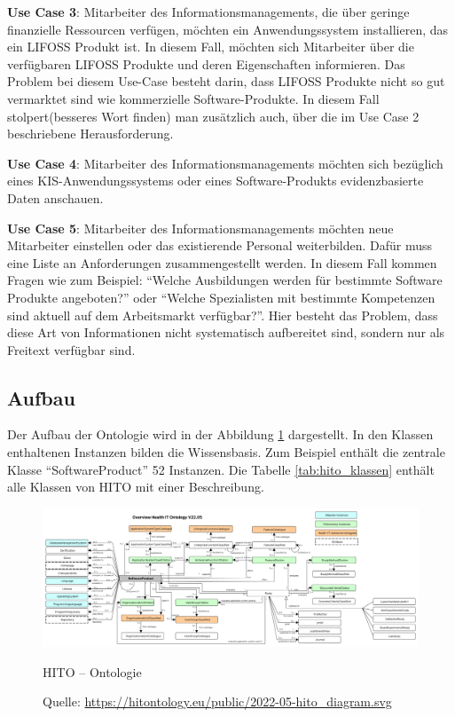 \textbf{Use Case 3}: Mitarbeiter des Informationsmanagements, die über geringe finanzielle Ressourcen verfügen, möchten ein Anwendungssystem installieren, das ein \ac{LIFOSS} Produkt ist.
In diesem Fall, möchten sich Mitarbeiter über die verfügbaren \ac{LIFOSS} Produkte und deren Eigenschaften informieren.
Das Problem bei diesem Use-Case besteht darin, dass \ac{LIFOSS} Produkte nicht so gut vermarktet sind wie kommerzielle Software-Produkte. 
In diesem Fall stolpert(besseres Wort finden) man zusätzlich auch, über die im Use Case 2 beschriebene Herausforderung. \newline

\textbf{Use Case 4}: Mitarbeiter des Informationsmanagements möchten sich bezüglich eines KIS-Anwendungssystems oder eines Software-Produkts evidenzbasierte Daten anschauen.  \newline

\textbf{Use Case 5}: Mitarbeiter des Informationsmanagements möchten neue Mitarbeiter einstellen oder das existierende Personal weiterbilden.
Dafür muss eine Liste an Anforderungen zusammengestellt werden.
In diesem Fall kommen Fragen wie zum Beispiel: \enquote{Welche Ausbildungen werden für bestimmte Software Produkte angeboten?} oder \enquote{Welche Spezialisten mit bestimmte Kompetenzen sind aktuell auf dem Arbeitsmarkt verfügbar?}.
Hier besteht das Problem, dass diese Art von Informationen nicht systematisch aufbereitet sind, sondern nur als Freitext verfügbar sind.\newline

\subsection{Aufbau}

Der Aufbau der Ontologie wird in der Abbildung \ref{fig:metamodel} dargestellt. 
In den Klassen enthaltenen Instanzen bilden die Wissensbasis.
Zum Beispiel enthält die zentrale Klasse \enquote{SoftwareProduct} 52 Instanzen.
Die Tabelle \ref{tab:hito_klassen} enthält alle Klassen von HITO mit einer Beschreibung.

\begin{figure}
    	\includegraphics[width=\textwidth]{Images/hito_metamodell}
   	\caption{HITO -- Ontologie}
	\caption*{\small Quelle: \url{https://hitontology.eu/public/2022-05-hito_diagram.svg}}
   	\label{fig:metamodel}
\end{figure}

